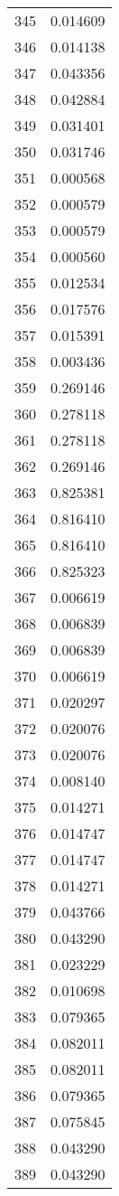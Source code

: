 \documentclass[12pt]{article}
\begin{document}
\begin{longtable}{@{}cc@{}}
345 & 0.014609 \\
346 & 0.014138 \\
347 & 0.043356 \\
348 & 0.042884 \\
349 & 0.031401 \\
350 & 0.031746 \\
351 & 0.000568 \\
352 & 0.000579 \\
353 & 0.000579 \\
354 & 0.000560 \\
355 & 0.012534 \\
356 & 0.017576 \\
357 & 0.015391 \\
358 & 0.003436 \\
359 & 0.269146 \\
360 & 0.278118 \\
361 & 0.278118 \\
362 & 0.269146 \\
363 & 0.825381 \\
364 & 0.816410 \\
365 & 0.816410 \\
366 & 0.825323 \\
367 & 0.006619 \\
368 & 0.006839 \\
369 & 0.006839 \\
370 & 0.006619 \\
371 & 0.020297 \\
372 & 0.020076 \\
373 & 0.020076 \\
374 & 0.008140 \\
375 & 0.014271 \\
376 & 0.014747 \\
377 & 0.014747 \\
378 & 0.014271 \\
379 & 0.043766 \\
380 & 0.043290 \\
381 & 0.023229 \\
382 & 0.010698 \\
383 & 0.079365 \\
384 & 0.082011 \\
385 & 0.082011 \\
386 & 0.079365 \\
387 & 0.075845 \\
388 & 0.043290 \\
389 & 0.043290 \\

\end{longtable}
\end{document}

